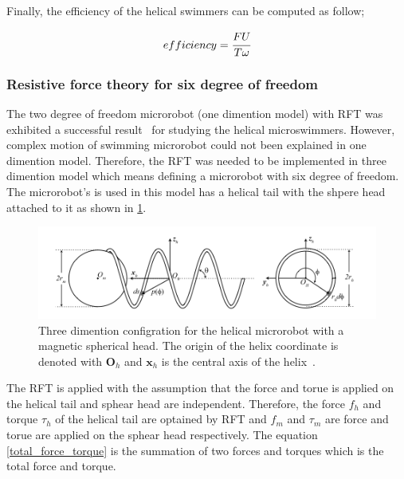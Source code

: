 \documentclass[12pt,a4paper,titlepage]{report}
\begin{document}
Finally, the efficiency of the helical swimmers can be computed as follow;



\begin{equation}
 efficiency = \cfrac{FU}{T \omega} 
\label{efficiency}
\end{equation}

 
\subsubsection{Resistive force theory for six degree of freedom}\label{RFT_sixDegree}
 



The two degree of freedom microrobot (one dimention model) with \ac*{RFT} was exhibited a successful result~\citep{mahoney2011velocity}
for studying the helical microswimmers. However, complex motion of swimming microrobot could not been 
explained in one dimention model. Therefore, the \ac*{RFT} was needed to be implemented in three dimention
model which means defining a microrobot with six degree of freedom. The microrobot\rq{}s is
used in this model has a helical tail with the shpere head attached to it as shown in \ref{RFT-6dof}.

\begin{figure}
  \centering
    \includegraphics[width=1.0\textwidth]{RFT-6dof}
  \caption[Helical microrobot configration with a magnetic spherical head]{Three dimention configration for the helical microrobot with a magnetic spherical head. The origin
of the helix coordinate is denoted with $\bm{O}_h$ and $\bm{x}_{h}$ is the central axis of the
 helix~\citep{mahoney2011velocity}.}
  \label{RFT-6dof}
\end{figure}

The \ac*{RFT} is applied with the assumption that the force and torue is applied on the helical tail and sphear
head are independent. Therefore, the force $f_h$ and torque $\tau_h$ of the helical tail are optained by \ac*{RFT} 
and $f_m$ and $\tau_m$ are force and torue are applied on the sphear head respectively. 
The equation \ref{total_force_torque} is the summation of two forces and torques which is the total force and torque. 
\end{document}
